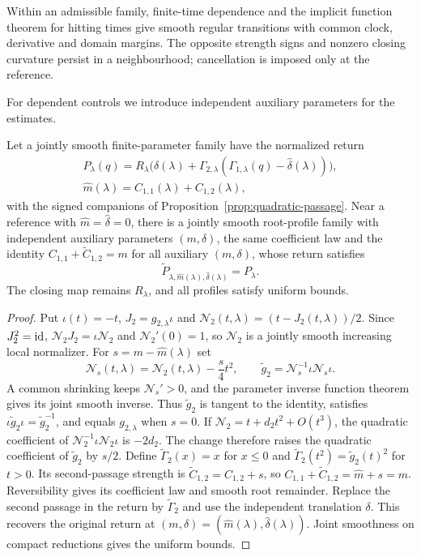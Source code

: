 Within an admissible family, finite-time dependence and the implicit
function theorem for hitting times give smooth regular transitions with
common clock, derivative and domain margins. The opposite strength signs
and nonzero closing curvature persist in a neighbourhood; cancellation is
imposed only at the reference.

For dependent controls we introduce independent auxiliary parameters for
the estimates.

\begin{lemma}
\label{lem:auxiliary-controls}
Let a jointly smooth finite-parameter family have the normalized return
\[
 \begin{gathered}
 P_\lambda(q)=R_\lambda\bigl(\widehat\delta(\lambda)+
 \Gamma_{2,\lambda}(\Gamma_{1,\lambda}(q)
                              -\widehat\delta(\lambda))\bigr),\\
 \widehat m(\lambda)=C_{1,1}(\lambda)+C_{1,2}(\lambda),
 \end{gathered}
\]
with the signed companions of Proposition~\ref{prop:quadratic-passage}.
Near a reference with $\widehat m=\widehat\delta=0$, there is a jointly
smooth root-profile family with independent auxiliary parameters
$(m,\delta)$, the same coefficient law and the identity
$C_{1,1}+\widetilde C_{1,2}=m$ for all auxiliary $(m,\delta)$,
whose return satisfies
\[
 \widetilde P_{\lambda,\widehat m(\lambda),
                       \widehat\delta(\lambda)}=P_\lambda.
\]
The closing map remains $R_\lambda$, and all profiles satisfy uniform
bounds.
\end{lemma}

\begin{proof}
Put $\iota(t)=-t$, $J_2=g_{2,\lambda}\iota$ and
$\mathcal N_2(t,\lambda)=(t-J_2(t,\lambda))/2$.
Since $J_2^2=\operatorname{id}$, $\mathcal N_2J_2=\iota\mathcal N_2$ and
$\mathcal N_2'(0)=1$, so $\mathcal N_2$ is a jointly smooth increasing
local normalizer. For $s=m-\widehat m(\lambda)$ set
\[
 \mathcal N_s(t,\lambda)=\mathcal N_2(t,\lambda)-\frac s4t^2,
 \qquad \widetilde g_2=\mathcal N_s^{-1}\iota\mathcal N_s\iota.
\]
A common shrinking keeps $\mathcal N_s'>0$, and the parameter inverse
function theorem gives its joint smooth inverse. Thus $\widetilde g_2$
is tangent to the identity, satisfies
$\iota\widetilde g_2\iota=\widetilde g_2^{-1}$, and equals $g_{2,\lambda}$
when $s=0$. If $\mathcal N_2=t+d_2t^2+O(t^3)$, the quadratic coefficient
of $\mathcal N_2^{-1}\iota\mathcal N_2\iota$ is $-2d_2$.
The change therefore raises the quadratic coefficient of $\widetilde g_2$
by $s/2$.
Define $\widetilde\Gamma_2(x)=x$ for $x\le0$ and
$\widetilde\Gamma_2(t^2)=\widetilde g_2(t)^2$ for $t>0$.
Its second-passage strength is $\widetilde C_{1,2}=C_{1,2}+s$, so
$C_{1,1}+\widetilde C_{1,2}=\widehat m+s=m$.
Reversibility gives its coefficient law and smooth root remainder.
Replace the second passage in the return by $\widetilde\Gamma_2$ and
use the independent translation $\delta$. This recovers the original
return at $(m,\delta)=(\widehat m(\lambda),\widehat\delta(\lambda))$. Joint
smoothness on compact reductions gives the uniform bounds.
\end{proof}

